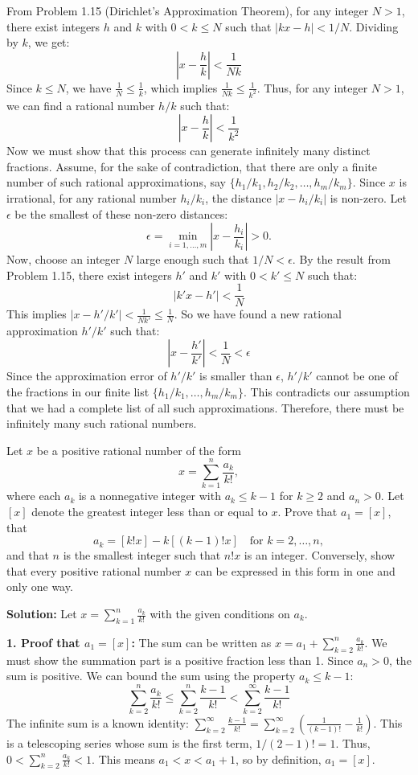 From Problem 1.15 (Dirichlet's Approximation Theorem), for any integer $N > 1$, there exist integers $h$ and $k$ with $0 < k \leq N$ such that $|kx - h| < 1/N$.
Dividing by $k$, we get:
\[
\left|x - \frac{h}{k}\right| < \frac{1}{Nk}
\]
Since $k \leq N$, we have $\frac{1}{N} \leq \frac{1}{k}$, which implies $\frac{1}{Nk} \leq \frac{1}{k^2}$.
Thus, for any integer $N>1$, we can find a rational number $h/k$ such that:
\[
\left|x - \frac{h}{k}\right| < \frac{1}{k^2}
\]
Now we must show that this process can generate infinitely many distinct fractions.
Assume, for the sake of contradiction, that there are only a finite number of such rational approximations, say $\{h_1/k_1, h_2/k_2, \ldots, h_m/k_m\}$.
Since $x$ is irrational, for any rational number $h_i/k_i$, the distance $|x - h_i/k_i|$ is non-zero. Let $\epsilon$ be the smallest of these non-zero distances:
\[
\epsilon = \min_{i=1,\dots,m} \left|x - \frac{h_i}{k_i}\right| > 0.
\]
Now, choose an integer $N$ large enough such that $1/N < \epsilon$.
By the result from Problem 1.15, there exist integers $h'$ and $k'$ with $0 < k' \leq N$ such that:
\[
|k'x - h'| < \frac{1}{N}
\]
This implies $|x - h'/k'| < \frac{1}{Nk'} \leq \frac{1}{N}$.
So we have found a new rational approximation $h'/k'$ such that:
\[
\left|x - \frac{h'}{k'}\right| < \frac{1}{N} < \epsilon
\]
Since the approximation error of $h'/k'$ is smaller than $\epsilon$, $h'/k'$ cannot be one of the fractions in our finite list $\{h_1/k_1, \ldots, h_m/k_m\}$. This contradicts our assumption that we had a complete list of all such approximations.
Therefore, there must be infinitely many such rational numbers.


\begin{problembox}
Let $x$ be a positive rational number of the form
\[
x = \sum_{k=1}^n \frac{a_k}{k!},
\]
where each $a_k$ is a nonnegative integer with $a_k \leq k - 1$ for $k \geq 2$ and $a_n > 0$. Let $[x]$ denote the greatest integer less than or equal to $x$. Prove that $a_1 = [x]$, that
\[
a_k = [k!x] - k[(k - 1)!x] \quad \text{for } k = 2, \dots, n,
\]
and that $n$ is the smallest integer such that $n!x$ is an integer. Conversely, show that every positive rational number $x$ can be expressed in this form in one and only one way.
\end{problembox}

\textbf{Solution:}
Let $x = \sum_{k=1}^n \frac{a_k}{k!}$ with the given conditions on $a_k$.

\textbf{1. Proof that $a_1 = [x]$:}
The sum can be written as $x = a_1 + \sum_{k=2}^n \frac{a_k}{k!}$. We must show the summation part is a positive fraction less than 1. Since $a_n > 0$, the sum is positive. We can bound the sum using the property $a_k \leq k-1$:
\[
\sum_{k=2}^n \frac{a_k}{k!} \leq \sum_{k=2}^n \frac{k-1}{k!} < \sum_{k=2}^{\infty} \frac{k-1}{k!}
\]
The infinite sum is a known identity: $\sum_{k=2}^{\infty} \frac{k-1}{k!} = \sum_{k=2}^{\infty} \left(\frac{1}{(k-1)!} - \frac{1}{k!}\right)$. This is a telescoping series whose sum is the first term, $1/(2-1)! = 1$.
Thus, $0 < \sum_{k=2}^n \frac{a_k}{k!} < 1$. This means $a_1 < x < a_1 + 1$, so by definition, $a_1 = [x]$.

